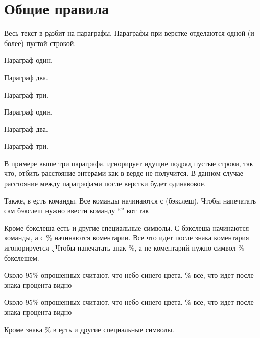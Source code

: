 \chapter{Общие правила}

Весь текст в \c разбит на параграфы. Параграфы при верстке отделаются
одной (и более) пустой строкой.

 \hfill
\startTEX
Параграф один.

Параграф два.


Параграф три.
\stopTEX
\stopdescr

 \hfill
\startCODERESULT
Параграф один.

Параграф два.


Параграф три.
\stopCODERESULT
\stopdescr

В примере выше три параграфа. \c игнорирует идущие подряд пустые строки, так
что, отбить расстояние энтерами как в верде не получится. В данном случае
расстояние между параграфами после верстки будет одинаковое.

Также, в \c есть команды. Все команды начинаются с \tex{} (бэкслеш). Чтобы
напечатать сам бэкслеш нужно ввести команду ``'' вот так

\vbox{
 \hfill
\startTEX
\tex{}
\stopTEX
\stopdescr
}

\vbox{
 \hfill
\startCODERESULT
\tex{}
\stopCODERESULT
\stopdescr
}

Кроме бэкслеша есть и другие специальные символы. С бэкслеша начинаются команды,
а с \% начинаются коментарии. Все что идет после знака коментария
игонорируется \c. Чтобы напечатать знак \%, а не коментарий
нужно  символ \% бэкслешем.

\vbox{
 \hfill
\startTEX
Около 95\% опрошенных считают, что небо синего цвета.
\% все, что идет после знака процента видно
\stopTEX
\stopdescr
}

\vbox{
 \hfill
\startCODERESULT
Около 95\% опрошенных считают, что небо синего цвета.
\% все, что идет после знака процента видно
\stopCODERESULT
\stopdescr
}

Кроме знака \% в \c есть и другие специальные символы.

